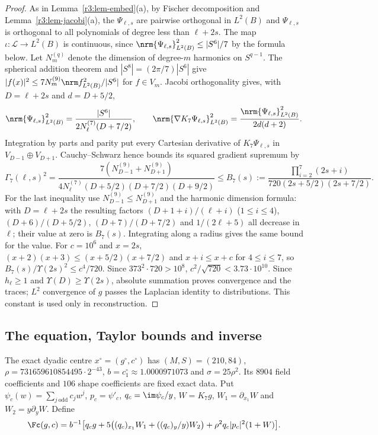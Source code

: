 \begin{proof}
As in Lemma~\ref{r3:lem-embed}(a), by Fischer decomposition and Lemma~\ref{r3:lem-jacobi}(a), the $\Psi_{\ell,s}$ are pairwise orthogonal in $L^2(B)$ and $\Psi_{\ell,s}$ is orthogonal to all polynomials of degree less than $\ell+2s$. The map $\iota\colon\mathcal L\to L^2(B)$ is continuous, since $\nrm{\Psi_{\ell,s}}^2_{L^2(B)}\leq|S^6|/7$ by the formula below. Let $N_m^{(q)}$ denote the dimension of degree-$m$ harmonics on $S^{q-1}$. The spherical addition theorem and $|S^8|=(2\pi/7)|S^6|$ give $|f(x)|^2\leq7N_m^{(9)}\nrm f_{L^2(B)}^2/|S^6|$ for $f\in V_m$. Jacobi orthogonality gives, with $D=\ell+2s$ and $d=D+5/2$,
\[
\nrm{\Psi_{\ell,s}}_{L^2(B)}^2=\frac{|S^6|}{2N_\ell^{(7)}(D+7/2)},\qquad
\nrm{\nabla K_7\Psi_{\ell,s}}_{L^2(B)}^2=\frac{\nrm{\Psi_{\ell,s}}_{L^2(B)}^2}{2d(d+2)}.
\]
Integration by parts and parity put every Cartesian derivative of $K_7\Psi_{\ell,s}$ in $V_{D-1}\oplus V_{D+1}$. Cauchy--Schwarz hence bounds its squared gradient supremum by
\[
\Gamma_7(\ell,s)^2=\frac{7(N_{D-1}^{(9)}+N_{D+1}^{(9)})}{4N_\ell^{(7)}(D+5/2)(D+7/2)(D+9/2)}
\leq B_7(s):=\frac{\prod_{i=2}^7(2s+i)}{720(2s+5/2)(2s+7/2)}.
\]
For the last inequality use $N_{D-1}^{(9)}\leq N_{D+1}^{(9)}$ and the harmonic dimension formula: with $D=\ell+2s$ the resulting factors $(D+1+i)/(\ell+i)$ ($1\leq i\leq4$), $(D+6)/(D+5/2)$, $(D+7)/(D+7/2)$ and $1/(2\ell+5)$ all decrease in $\ell$; their value at zero is $B_7(s)$. Integrating along a radius gives the same bound for the value. For $c=10^6$ and $x=2s$, $(x+2)(x+3)\leq(x+5/2)(x+7/2)$ and $x+i\leq x+c$ for $4\leq i\leq7$, so $B_7(s)/\Upsilon(2s)^2\leq c^4/720$. Since $373^2\cdot720>10^8$, $c^2/\sqrt{720}<3.73\cdot10^{10}$. Since $h_\ell\geq1$ and $\Upsilon(D)\geq\Upsilon(2s)$, absolute summation proves convergence and the traces; $L^2$ convergence of $g$ passes the Laplacian identity to distributions. This constant is used only in reconstruction.
\end{proof}

\subsection{The equation, Taylor bounds and inverse}\label{r7:sec-F}
The exact dyadic centre $x^\circ=(g^\circ,c^\circ)$ has $(M,S)=(210,84)$, $\rho=731659610854495\cdot2^{-43}$, $b=c^\circ_1\approx1.0000971073$ and $\sigma=25\rho^2$. Its $8904$ field coefficients and $106$ shape coefficients are fixed exact data. Put $\psi_c(w)=\sum_{j\ \mathrm{odd}}c_jw^j$, $p_c=\psi'_c$, $q_c=\im\psi_c/y$, $W=K_7g$, $W_1=\partial_{x_1}W$ and $W_2=y\partial_yW$. Define
\begin{equation}\label{r7:eq-F}
\Fc(g,c)=b^{-1}\big[q_cg+5\big((q_c)_{x_1}W_1+((q_c)_y/y)W_2\big)+\rho^2q_c|p_c|^2(1+W)\big].
\end{equation}


